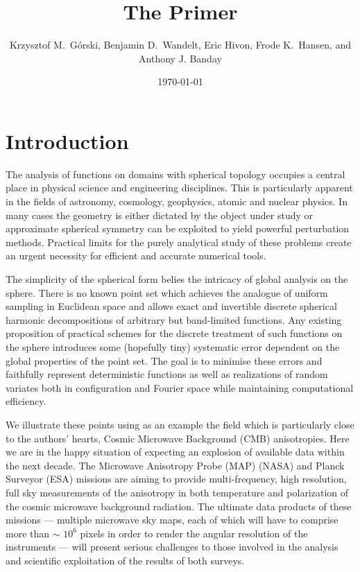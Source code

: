 \documentclass[12pt,twoside]{article}
\begin{document}
\title{The \healpix Primer}
\author{Krzysztof M.~G\'orski, Benjamin D.~Wandelt, Eric Hivon, Frode K.~Hansen,
and Anthony J. Banday}

\date{\today}

\frontpage
\tableofcontents
\newpage

\section{Introduction}

The analysis of functions on  domains with spherical topology occupies a
central place in physical science and engineering disciplines. 
This is particularly apparent in the fields of astronomy, cosmology, 
geophysics,  atomic and nuclear physics. In many cases the geometry is either
dictated by the object under study or approximate spherical symmetry can be
exploited to yield powerful perturbation methods. Practical
limits for the purely analytical study of these problems create
an urgent necessity for efficient and accurate numerical tools.

The 
simplicity of the spherical form belies the intricacy of global
analysis on the sphere. There is no known
point set which achieves the analogue of uniform sampling in Euclidean space and
allows exact and invertible discrete spherical harmonic decompositions
of arbitrary but band-limited functions. Any existing proposition of practical
schemes for the  discrete treatment of such functions 
on the sphere  introduces some (hopefully tiny) 
systematic error dependent on the global properties of
the point set. The goal is to minimise these errors and
faithfully represent deterministic functions as well as realizations of
random variates both
in configuration and Fourier space while maintaining computational efficiency.

We illustrate these points using as an example the field which is particularly 
close to the authors' hearts, Cosmic Microwave Background (CMB)
anisotropies. Here we are in the happy situation of expecting an explosion
of available data within the next decade.
The  Microwave Anisotropy Probe (MAP) (NASA) and Planck Surveyor (ESA)
missions are aiming
to provide multi-frequency, high resolution, full sky measurements of the anisotropy in
both temperature and polarization of the cosmic microwave
background radiation.
The ultimate data products of these missions ---
multiple microwave sky maps, each of which will have to comprise 
more than $\sim $ $10^6$ pixels in order to render the angular 
resolution of the instruments ---
will present serious challenges to those involved in the
analysis and scientific exploitation of the results of both surveys.
 
\end{document}

